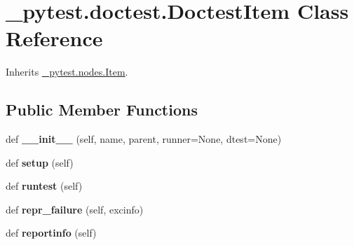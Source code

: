 \hypertarget{class__pytest_1_1doctest_1_1_doctest_item}{}\section{\+\_\+pytest.\+doctest.\+Doctest\+Item Class Reference}
\label{class__pytest_1_1doctest_1_1_doctest_item}


Inherits \hyperlink{class__pytest_1_1nodes_1_1_item}{\+\_\+pytest.\+nodes.\+Item}.

\subsection*{Public Member Functions}
\begin{DoxyCompactItemize}
\item 
\mbox{\label{class__pytest_1_1doctest_1_1_doctest_item_a1713e01be99c03c20d260ec393fb92fd}} 
def {\bfseries \+\_\+\+\_\+init\+\_\+\+\_\+} (self, name, parent, runner=None, dtest=None)
\item 
\mbox{\label{class__pytest_1_1doctest_1_1_doctest_item_a98783027396abc5988b45e0110128b49}} 
def {\bfseries setup} (self)
\item 
\mbox{\label{class__pytest_1_1doctest_1_1_doctest_item_af833af4e94deee90b9b7410489d3808a}} 
def {\bfseries runtest} (self)
\item 
\mbox{\label{class__pytest_1_1doctest_1_1_doctest_item_a01e28b872c52b52b493f89511e7bb5d6}} 
def {\bfseries repr\+\_\+failure} (self, excinfo)
\item 
\mbox{\label{class__pytest_1_1doctest_1_1_doctest_item_a32a9ee20cf03d1363c62dd7bb1159963}} 
def {\bfseries reportinfo} (self)
\end{DoxyCompactItemize}
